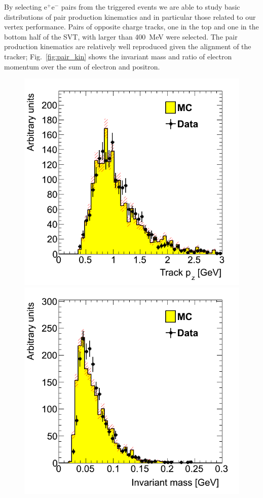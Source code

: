 By selecting e$^{+}$e$^{-}$ pairs from the triggered events we are able to study basic distributions of pair production kinematics and in particular those related to our vertex performance. Pairs of opposite charge tracks, one in the top and one in the bottom half of the SVT, with larger than 400~MeV were selected. The pair production kinematics are relatively well reproduced given the alignment of the tracker; Fig.~\ref{fig:pair_kin} shows the invariant mass and ratio of electron momentum over the sum of electron and positron. 
\begin{figure}[ht]
   \includegraphics[scale=0.25]{test2012/vertexing/figures/h_trk_top_px_h_trk_top_px_trigseltwotrksel4hit_recoilmc_twotrkfilt.png}
   \includegraphics[scale=0.25]{test2012/vertexing/figures/h_invM_h_invM_dataMC_trigseltwotrksel4hit_recoilmc_twotrkfilt.png}

\end{figure}
